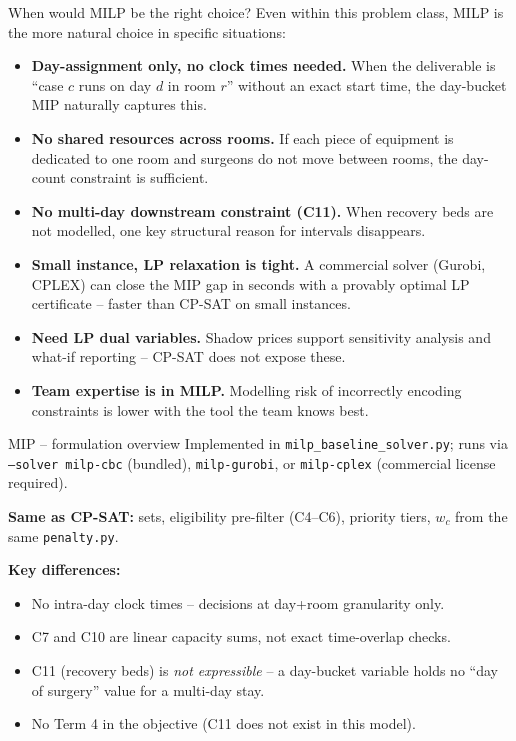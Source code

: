 \documentclass[10pt,aspectratio=169]{beamer}
\newcommand{\bk}{\hfill\hyperlink{toc}{\beamerreturnbutton{Agenda}}}
\begin{document}
\begin{frame}{When would MILP be the right choice?}
  \small Even within this problem class, MILP is the more natural choice in
  specific situations:
  \begin{itemize}
    \item \textbf{Day-assignment only, no clock times needed.} When the
      deliverable is ``case $c$ runs on day $d$ in room $r$'' without an
      exact start time, the day-bucket MIP naturally captures this.
    \item \textbf{No shared resources across rooms.} If each piece of
      equipment is dedicated to one room and surgeons do not move between
      rooms, the day-count constraint is sufficient.
    \item \textbf{No multi-day downstream constraint (C11).} When recovery
      beds are not modelled, one key structural reason for intervals
      disappears.
    \item \textbf{Small instance, LP relaxation is tight.} A commercial
      solver (Gurobi, CPLEX) can close the MIP gap in seconds with a
      provably optimal LP certificate -- faster than CP-SAT on small instances.
    \item \textbf{Need LP dual variables.} Shadow prices support sensitivity
      analysis and what-if reporting -- CP-SAT does not expose these.
    \item \textbf{Team expertise is in MILP.} Modelling risk of incorrectly
      encoding constraints is lower with the tool the team knows best.
  \end{itemize}
  \bk
\end{frame}

\begin{frame}{MIP -- formulation overview}
  \hypertarget{mip1}{}
  Implemented in \texttt{milp\_baseline\_solver.py}; runs via
  \texttt{--solver milp-cbc} (bundled), \texttt{milp-gurobi}, or
  \texttt{milp-cplex} (commercial license required).

  \textbf{Same as CP-SAT:} sets, eligibility pre-filter (C4--C6),
  priority tiers, $w_c$ from the same \texttt{penalty.py}.

  \textbf{Key differences:}
  \begin{itemize}\small
    \item No intra-day clock times -- decisions at day+room granularity only.
    \item C7 and C10 are linear capacity sums, not exact time-overlap checks.
    \item C11 (recovery beds) is \emph{not expressible} -- a day-bucket
      variable holds no ``day of surgery'' value for a multi-day stay.
    \item No Term 4 in the objective (C11 does not exist in this model).
  \end{itemize}
  \bk
\end{frame}
\end{document}
